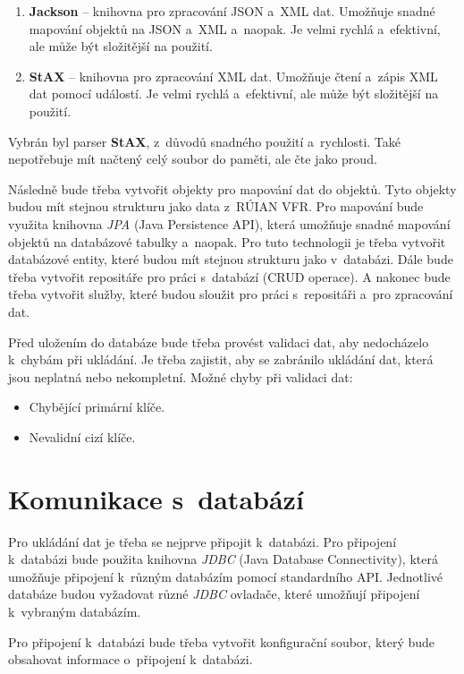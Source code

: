 \begin{enumerate}
    \item \textbf{Jackson} -- knihovna pro zpracování JSON a~XML dat. Umožňuje snadné mapování
    objektů na JSON a~XML a~naopak. Je velmi rychlá a~efektivní, ale může být složitější na použití.
    \item \textbf{StAX} -- knihovna pro zpracování XML dat. Umožňuje
    čtení a~zápis XML dat pomocí událostí. Je velmi rychlá a~efektivní, ale může být
    složitější na použití.
\end{enumerate}

Vybrán byl parser \textbf{StAX}, z~důvodů snadného použití a~rychlosti.
Také nepotřebuje mít načtený celý soubor do paměti, ale čte jako proud.

Následně bude třeba vytvořit objekty pro mapování dat do objektů.
Tyto objekty budou mít stejnou strukturu jako data z~RÚIAN VFR.
Pro mapování bude využita knihovna \textit{JPA} (Java Persistence API), která umožňuje snadné
mapování objektů na databázové tabulky a~naopak.
Pro tuto technologii je třeba vytvořit databázové entity, které budou mít stejnou strukturu jako
v~databázi. Dále bude třeba vytvořit repositáře pro práci s~databází (CRUD operace).
A nakonec bude třeba vytvořit služby, které budou sloužit pro práci s~repositáři a~pro zpracování dat.

Před uložením do databáze bude třeba provést validaci dat, aby nedocházelo k~chybám při
ukládání. Je třeba zajistit, aby se zabránilo ukládání dat, která jsou neplatná nebo nekompletní.
Možné chyby při validaci dat:
\begin{itemize}
    \item Chybějící primární klíče.
    \item Nevalidní cizí klíče.
\end{itemize}

\section{Komunikace s~databází}
\label{sec:komunikaceDB}
Pro ukládání dat je třeba se nejprve připojit k~databázi.
Pro připojení k~databázi bude použita knihovna \textit{JDBC} (Java Database Connectivity), která
umožňuje připojení k~různým databázím pomocí standardního API.
Jednotlivé databáze budou vyžadovat různé \textit{JDBC} ovladače, které umožňují připojení k~vybraným databázím.

Pro připojení k~databázi bude třeba vytvořit konfigurační soubor, který bude obsahovat
informace o~připojení k~databázi.

